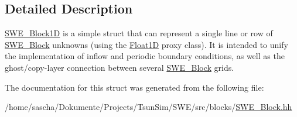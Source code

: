 \subsection{Detailed Description}
\hyperlink{structSWE__Block1D}{S\-W\-E\-\_\-\-Block1\-D} is a simple struct that can represent a single line or row of \hyperlink{classSWE__Block}{S\-W\-E\-\_\-\-Block} unknowns (using the \hyperlink{classFloat1D}{Float1\-D} proxy class). It is intended to unify the implementation of inflow and periodic boundary conditions, as well as the ghost/copy-\/layer connection between several \hyperlink{classSWE__Block}{S\-W\-E\-\_\-\-Block} grids. 

The documentation for this struct was generated from the following file\-:\begin{DoxyCompactItemize}
\item 
/home/sascha/\-Dokumente/\-Projects/\-Tsun\-Sim/\-S\-W\-E/src/blocks/\hyperlink{SWE__Block_8hh}{S\-W\-E\-\_\-\-Block.\-hh}\end{DoxyCompactItemize}
